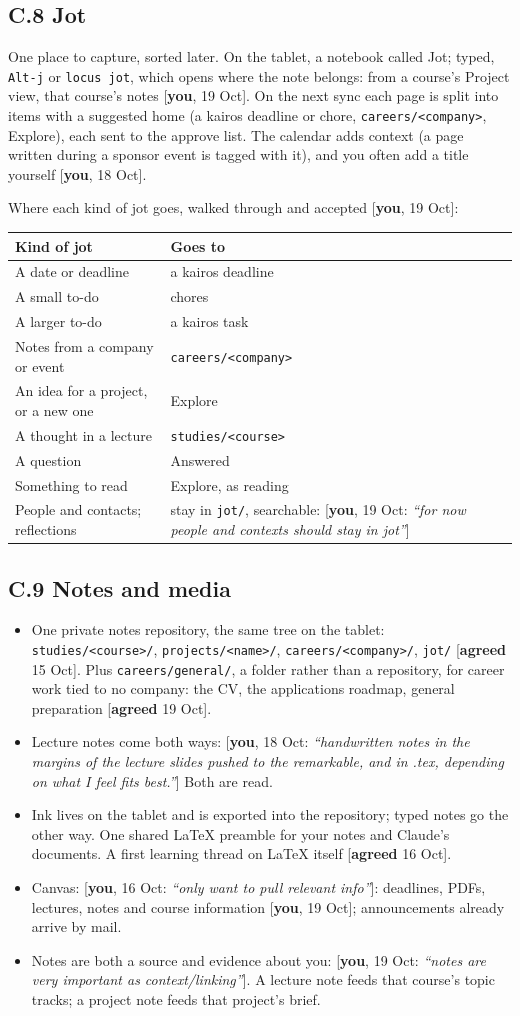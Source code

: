 \documentclass[10pt]{extarticle}
\newcommand{\you}[2]{{\small[\textbf{you}, #1: \textit{``#2''}]}}
\newcommand{\youx}[1]{{\small[\textbf{you}, #1]}}
\newcommand{\agreed}[1]{{\small[\textbf{agreed} #1]}}
\newcommand{\Sub}[1]{\subsection*{#1}}
\begin{document}
\Sub{C.8 Jot}
One place to capture, sorted later. On the tablet, a notebook called Jot; typed, \texttt{Alt-j} or \texttt{locus jot}, which opens where the note belongs: from a course's Project view, that course's notes \youx{19 Oct}. On the next sync each page is split into items with a suggested home (a kairos deadline or chore, \texttt{careers/<company>}, Explore), each sent to the approve list. The calendar adds context (a page written during a sponsor event is tagged with it), and you often add a title yourself \youx{18 Oct}.

Where each kind of jot goes, walked through and accepted \youx{19 Oct}:

\begin{tabularx}{\linewidth}{@{}l Y@{}}
\toprule
Kind of jot & Goes to \\
\midrule
A date or deadline & a kairos deadline \\
A small to-do & chores \\
A larger to-do & a kairos task \\
Notes from a company or event & \texttt{careers/<company>} \\
An idea for a project, or a new one & Explore \\
A thought in a lecture & \texttt{studies/<course>} \\
A question & Answered \\
Something to read & Explore, as reading \\
People and contacts; reflections & stay in \texttt{jot/}, searchable: \you{19 Oct}{for now people and contexts should stay in jot} \\
\bottomrule
\end{tabularx}

\Sub{C.9 Notes and media}
\begin{itemize}
\item One private notes repository, the same tree on the tablet: \texttt{studies/<course>/}, \texttt{projects/<name>/}, \texttt{careers/<company>/}, \texttt{jot/} \agreed{15 Oct}. Plus \texttt{careers/general/}, a folder rather than a repository, for career work tied to no company: the CV, the applications roadmap, general preparation \agreed{19 Oct}.
\item Lecture notes come both ways: \you{18 Oct}{handwritten notes in the margins of the lecture slides pushed to the remarkable, and in .tex, depending on what I feel fits best.} Both are read.
\item Ink lives on the tablet and is exported into the repository; typed notes go the other way. One shared LaTeX preamble for your notes and Claude's documents. A first learning thread on LaTeX itself \agreed{16 Oct}.
\item Canvas: \you{16 Oct}{only want to pull relevant info}: deadlines, PDFs, lectures, notes and course information \youx{19 Oct}; announcements already arrive by mail.
\item Notes are both a source and evidence about you: \you{19 Oct}{notes are very important as context/linking}. A lecture note feeds that course's topic tracks; a project note feeds that project's brief.
\end{itemize}
\end{document}
